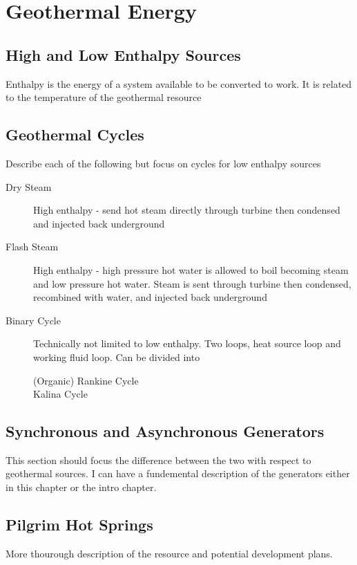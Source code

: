 \chapter{Geothermal Energy}
\label{ch:geothermal}

\section{High and Low Enthalpy Sources}
Enthalpy is the energy of a system available to be converted to work. It is related to the temperature of the geothermal resource

\section{Geothermal Cycles}
Describe each of the following but focus on cycles for low enthalpy sources
\begin{description}
\item[Dry Steam] High enthalpy - send hot steam directly through turbine then condensed and injected back underground
\item[Flash Steam] High enthalpy - high pressure hot water is allowed to boil becoming steam and low pressure hot water. Steam is sent through turbine then condensed, recombined with water, and injected back underground
\item[Binary Cycle] Technically not limited to low enthalpy. Two loops, heat source loop and working fluid loop. Can be divided into
\begin{description}
\item[(Organic) Rankine Cycle]
\item[Kalina Cycle]
\end{description}
\end{description}

\section{Synchronous and Asynchronous Generators}
This section should focus the difference between the two with respect to geothermal sources. I can have a fundemental description of the generators either in this chapter or the intro chapter.


\section{Pilgrim Hot Springs}
More thourough description of the resource and potential development plans.


